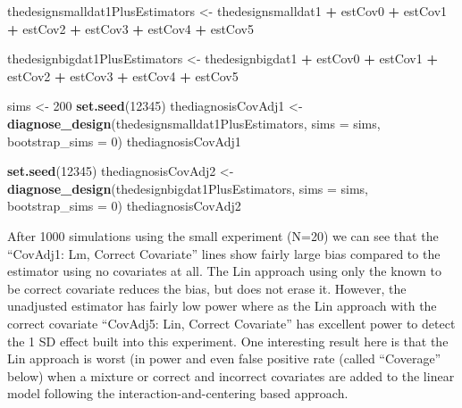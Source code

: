 \documentclass[
  12pt,
]{book}
\newenvironment{Shaded}{\begin{snugshade}}{\end{snugshade}}
\newcommand{\DataTypeTok}[1]{\textcolor[rgb]{0.13,0.29,0.53}{#1}}
\newcommand{\DecValTok}[1]{\textcolor[rgb]{0.00,0.00,0.81}{#1}}
\newcommand{\KeywordTok}[1]{\textcolor[rgb]{0.13,0.29,0.53}{\textbf{#1}}}
\newcommand{\NormalTok}[1]{#1}
\newcommand{\OperatorTok}[1]{\textcolor[rgb]{0.81,0.36,0.00}{\textbf{#1}}}
\newcommand{\StringTok}[1]{\textcolor[rgb]{0.31,0.60,0.02}{#1}}
\theoremstyle{definition}
\theoremstyle{definition}
\theoremstyle{definition}
\theoremstyle{remark}
\begin{document}
\begin{Shaded}
\begin{Highlighting}[]
\NormalTok{thedesignsmalldat1PlusEstimators <-}\StringTok{ }\NormalTok{thedesignsmalldat1 }\OperatorTok{+}\StringTok{ }\NormalTok{estCov0 }\OperatorTok{+}\StringTok{ }\NormalTok{estCov1 }\OperatorTok{+}\StringTok{ }\NormalTok{estCov2 }\OperatorTok{+}
\StringTok{  }\NormalTok{estCov3 }\OperatorTok{+}\StringTok{ }\NormalTok{estCov4 }\OperatorTok{+}\StringTok{ }\NormalTok{estCov5}

\NormalTok{thedesignbigdat1PlusEstimators <-}\StringTok{ }\NormalTok{thedesignbigdat1 }\OperatorTok{+}\StringTok{ }\NormalTok{estCov0 }\OperatorTok{+}\StringTok{ }\NormalTok{estCov1 }\OperatorTok{+}\StringTok{ }\NormalTok{estCov2 }\OperatorTok{+}
\StringTok{  }\NormalTok{estCov3 }\OperatorTok{+}\StringTok{ }\NormalTok{estCov4 }\OperatorTok{+}\StringTok{ }\NormalTok{estCov5}
\end{Highlighting}
\end{Shaded}

\begin{Shaded}
\begin{Highlighting}[]
\NormalTok{sims <-}\StringTok{ }\DecValTok{200}
\KeywordTok{set.seed}\NormalTok{(}\DecValTok{12345}\NormalTok{)}
\NormalTok{thediagnosisCovAdj1 <-}\StringTok{ }\KeywordTok{diagnose_design}\NormalTok{(thedesignsmalldat1PlusEstimators, }\DataTypeTok{sims =}\NormalTok{ sims, }\DataTypeTok{bootstrap_sims =} \DecValTok{0}\NormalTok{)}
\NormalTok{thediagnosisCovAdj1}
\end{Highlighting}
\end{Shaded}

\begin{Shaded}
\begin{Highlighting}[]
\KeywordTok{set.seed}\NormalTok{(}\DecValTok{12345}\NormalTok{)}
\NormalTok{thediagnosisCovAdj2 <-}\StringTok{ }\KeywordTok{diagnose_design}\NormalTok{(thedesignbigdat1PlusEstimators, }\DataTypeTok{sims =}\NormalTok{ sims, }\DataTypeTok{bootstrap_sims =} \DecValTok{0}\NormalTok{)}
\NormalTok{thediagnosisCovAdj2}
\end{Highlighting}
\end{Shaded}

After 1000 simulations using the small experiment (N=20) we can see that
the ``CovAdj1: Lm, Correct Covariate'' lines show fairly large bias
compared to the estimator using no covariates at all. The Lin approach
using only the known to be correct covariate reduces the bias, but does
not erase it. However, the unadjusted estimator has fairly low power
where as the Lin approach with the correct covariate ``CovAdj5: Lin,
Correct Covariate'' has excellent power to detect the 1 SD effect built
into this experiment. One interesting result here is that the Lin
approach is worst (in power and even false positive rate (called
``Coverage'' below) when a mixture or correct and incorrect covariates
are added to the linear model following the interaction-and-centering
based approach.
\end{document}
